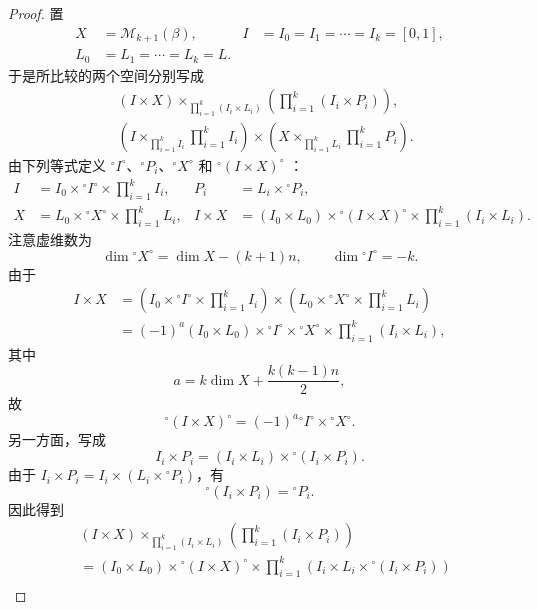 \begin{proof}
置
\[
\begin{aligned}
 X&=\mathcal M_{k+1}(\beta),
 &I&=I_0=I_1=\cdots=I_k=[0,1],\\
 L_0&=L_1=\cdots=L_k=L.
\end{aligned}
\]
于是所比较的两个空间分别写成
\[
\begin{aligned}
 &(I\times X)
 \mathop{\times}_{\prod_{i=1}^{k}(I_i\times L_i)}
 \left(\prod_{i=1}^{k}(I_i\times P_i)\right),\\
 &\left(I\mathop{\times}_{\prod_{i=1}^{k}I_i}
 \prod_{i=1}^{k}I_i\right)
 \times
 \left(X\mathop{\times}_{\prod_{i=1}^{k}L_i}
 \prod_{i=1}^{k}P_i\right).
\end{aligned}
\]
由下列等式定义
${}^\circ I^\circ$、${}^\circ P_i$、${}^\circ X^\circ$
和 ${}^\circ(I\times X)^\circ$
：
\[
\begin{aligned}
 I&=I_0\times{}^\circ I^\circ\times\prod_{i=1}^{k}I_i,
 &P_i&=L_i\times{}^\circ P_i,\\
 X&=L_0\times{}^\circ X^\circ\times\prod_{i=1}^{k}L_i,
 &I\times X&=(I_0\times L_0)
 \times{}^\circ(I\times X)^\circ
 \times\prod_{i=1}^{k}(I_i\times L_i).
\end{aligned}
\]
注意虚维数为
\[
 \dim{}^\circ X^\circ=\dim X-(k+1)n,
 \qquad
 \dim{}^\circ I^\circ=-k.
\]
由于
\[
\begin{aligned}
 I\times X
 &=\left(I_0\times{}^\circ I^\circ\times\prod_{i=1}^{k}I_i\right)
 \times
 \left(L_0\times{}^\circ X^\circ\times\prod_{i=1}^{k}L_i\right)\\
 &=(-1)^a(I_0\times L_0)
 \times{}^\circ I^\circ\times{}^\circ X^\circ
 \times\prod_{i=1}^{k}(I_i\times L_i),
\end{aligned}
\]
其中
\[
 a=k\dim X+\frac{k(k-1)n}{2},
\]
故
\[
 {}^\circ(I\times X)^\circ
 =(-1)^a{}^\circ I^\circ\times{}^\circ X^\circ.
\]
另一方面，写成
\[
 I_i\times P_i=(I_i\times L_i)
 \times{}^\circ(I_i\times P_i).
\]
由于
$I_i\times P_i=I_i\times(L_i\times{}^\circ P_i)$，有
\[
 {}^\circ(I_i\times P_i)={}^\circ P_i.
\]
因此得到
\begingroup
\small
\[
\begin{aligned}
 &(I\times X)
 \mathop{\times}_{\prod_{i=1}^{k}(I_i\times L_i)}
 \left(\prod_{i=1}^{k}(I_i\times P_i)\right)\\
 &=(I_0\times L_0)\times{}^\circ(I\times X)^\circ
 \times\prod_{i=1}^{k}
 \left(I_i\times L_i\times{}^\circ(I_i\times P_i)\right)\\

\end{aligned}\]
\end{proof}

